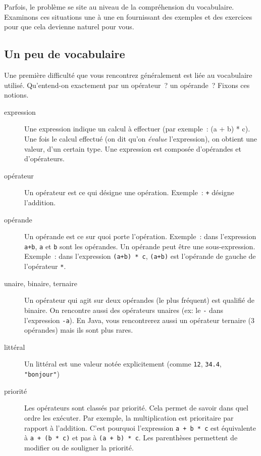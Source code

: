 		Parfois, le problème se site au niveau de la compréhension du vocabulaire.
		Examinons ces situations une à une
		en fournissant des exemples et des exercices
		pour que cela devienne naturel pour vous.

		\subsection{Un peu de vocabulaire}

			Une première difficulté que vous rencontrez généralement 
			est liée au vocabulaire utilisé. 
			Qu’entend-on exactement par un opérateur~? un opérande~? 
			Fixons ces notions.
			
			\begin{description}
			\item[expression]
				Une expression indique un calcul à effectuer
				(par exemple~: (a + b) * c).
				Une fois le calcul effectué
				(on dit qu’on \emph{évalue} l’expression), 
				on obtient une valeur, d’un certain type.
				Une expression est composée d’opérandes et d’opérateurs.
			\item[opérateur]
				Un opérateur est ce qui désigne une opération.
				Exemple~: \Verb_+_ désigne l’addition.
			\item[opérande]
				Un opérande est ce sur quoi porte l’opération.
				Exemple~: dans l’expression \Verb_a+b_, 
				\Verb_a_ et \Verb_b_ sont les opérandes.
				Un opérande peut être une sous-expression.
				Exemple~: dans l’expression \Verb_(a+b) * c_, 
				\Verb_(a+b)_ est l’opérande 
				de gauche de l’opérateur \Verb_*_.
			\item[unaire, binaire, ternaire]
				Un opérateur qui agit sur deux opérandes (le plus fréquent)
				est qualifié de binaire. 
				On rencontre aussi des opérateurs unaires (ex: le \Verb_-_ 
				dans l’expression \Verb_-a_).
				En Java, vous rencontrerez aussi un opérateur ternaire (3 opérandes)
				mais ils sont plus rares.
			\item[littéral]
				Un littéral est une valeur notée explicitement 
				(comme \Verb_12_, \Verb_34.4_, \Verb_"bonjour"_)
			\item[priorité]
				Les opérateurs sont classés par priorité. 
				Cela permet de savoir dans quel ordre les exécuter.
				Par exemple, la multiplication est prioritaire par rapport à l’addition.
				C’est pourquoi l’expression \Verb_a + b * c_ 
				est équivalente à \Verb_a + (b * c)_ et pas à \Verb_(a + b) * c_.
				Les parenthèses permettent de modifier ou de souligner la priorité.
			\end{description}
			
